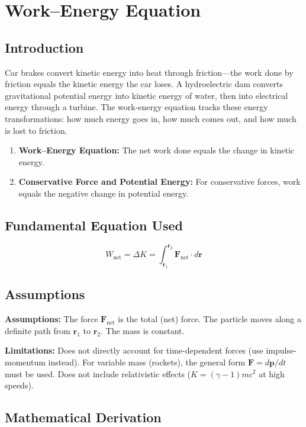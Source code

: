 \chapter{Work--Energy Equation}

\section*{Introduction}

Car brakes convert kinetic energy into heat through friction---the work done by friction equals the kinetic energy the car loses. A hydroelectric dam converts gravitational potential energy into kinetic energy of water, then into electrical energy through a turbine. The work-energy equation tracks these energy transformations: how much energy goes in, how much comes out, and how much is lost to friction.

\begin{enumerate}
\item \textbf{Work--Energy Equation:} The net work done equals the change in kinetic energy.

\item \textbf{Conservative Force and Potential Energy:} For conservative forces, work equals the negative change in potential energy.

\end{enumerate}
\section*{Fundamental Equation Used}

\[
W_{\text{net}} = \Delta K = \int_{\mathbf{r}_1}^{\mathbf{r}_2} \mathbf{F}_{\text{net}} \cdot d\mathbf{r}
\]


\section*{Assumptions}

\textbf{Assumptions:} The force $\mathbf{F}_{\text{net}}$ is the total (net) force. The particle moves along a definite path from $\mathbf{r}_1$ to $\mathbf{r}_2$. The mass is constant.


\textbf{Limitations:} Does not directly account for time-dependent forces (use impulse-momentum instead). For variable mass (rockets), the general form $\mathbf{F} = d\mathbf{p}/dt$ must be used. Does not include relativistic effects ($K = (\gamma - 1)mc^2$ at high speeds).


\section*{Mathematical Derivation}

